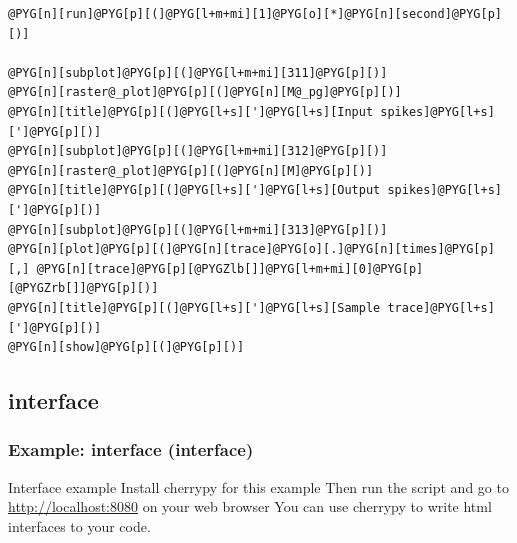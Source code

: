 \documentclass[letterpaper,10pt,english]{manual}
\begin{document}
\begin{Verbatim}[commandchars=@\[\]]
@PYG[n][run]@PYG[p][(]@PYG[l+m+mi][1]@PYG[o][*]@PYG[n][second]@PYG[p][)]

@PYG[n][subplot]@PYG[p][(]@PYG[l+m+mi][311]@PYG[p][)]
@PYG[n][raster@_plot]@PYG[p][(]@PYG[n][M@_pg]@PYG[p][)]
@PYG[n][title]@PYG[p][(]@PYG[l+s][']@PYG[l+s][Input spikes]@PYG[l+s][']@PYG[p][)]
@PYG[n][subplot]@PYG[p][(]@PYG[l+m+mi][312]@PYG[p][)]
@PYG[n][raster@_plot]@PYG[p][(]@PYG[n][M]@PYG[p][)]
@PYG[n][title]@PYG[p][(]@PYG[l+s][']@PYG[l+s][Output spikes]@PYG[l+s][']@PYG[p][)]
@PYG[n][subplot]@PYG[p][(]@PYG[l+m+mi][313]@PYG[p][)]
@PYG[n][plot]@PYG[p][(]@PYG[n][trace]@PYG[o][.]@PYG[n][times]@PYG[p][,] @PYG[n][trace]@PYG[p][@PYGZlb[]]@PYG[l+m+mi][0]@PYG[p][@PYGZrb[]]@PYG[p][)]
@PYG[n][title]@PYG[p][(]@PYG[l+s][']@PYG[l+s][Sample trace]@PYG[l+s][']@PYG[p][)]
@PYG[n][show]@PYG[p][(]@PYG[p][)]
\end{Verbatim}


\subsection{interface}

\resetcurrentobjects
\hypertarget{--doc-examples-interface_interface}{}

\hypertarget{example-interface-interface}{}\subsubsection{Example: interface (interface)}

Interface example
Install cherrypy for this example
Then run the script and go to \href{http://localhost:8080}{http://localhost:8080} on your web browser
You can use cherrypy to write html interfaces to your code.
\end{document}
